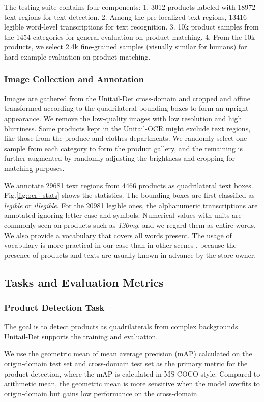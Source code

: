 \documentclass[runningheads]{llncs}
\begin{document}
The testing suite contains four components: 1. 3012 products labeled with 18972 text regions for text detection. 2. Among the pre-localized text regions, 13416 legible word-level transcriptions for text recognition. 3. 10k product samples from the 1454 categories for general evaluation on product matching. 4. From the 10k products, we select 2.4k fine-grained samples (visually similar for humans) for hard-example evaluation on product matching.

\subsubsection{Image Collection and Annotation} 
Images are gathered from the Unitail-Det cross-domain and cropped and affine transformed according to the quadrilateral bounding boxes to form an upright appearance. We remove the low-quality images with low resolution and high blurriness. Some products kept in the Unitail-OCR might exclude text regions, like those from the produce and clothes departments. We randomly select one sample from each category to form the product gallery, and the remaining is further augmented by randomly adjusting the brightness and cropping for matching purposes. 

We annotate 29681 text regions from 4466 products as quadrilateral text boxes. Fig.\ref{fig:ocr_stats} shows the statistics. The bounding boxes are first classified as \textit{legible} or \textit{illegible}. For the 20981 legible ones, the alphanumeric transcriptions are annotated ignoring letter case and symbols. Numerical values with units are commonly seen on products such as \textit{120mg}, and we regard them as entire words. We also provide a vocabulary that covers all words present. The usage of vocabulary is more practical in our case than in other scenes \cite{ICDAR15}, because the presence of products and texts are usually known in advance by the store owner. 

\subsection{Tasks and Evaluation Metrics}
\subsubsection{Product Detection Task}
The goal is to detect products as quadrilaterals from complex backgrounds. Unitail-Det supports the training and evaluation.

We use the geometric mean of mean average precision (mAP) calculated on the origin-domain test set and cross-domain test set as the primary metric for the product detection, where the mAP is calculated in MS-COCO style\cite{lin2014microsoft}. Compared to arithmetic mean, the geometric mean is more sensitive when the model overfits to origin-domain but gains low performance on the cross-domain. 
\end{document}

